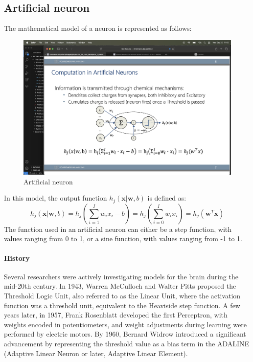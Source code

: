 \subsection{Artificial neuron}
The mathematical model of a neuron is represented as follows:
\begin{figure}[H]
    \centering
    \includegraphics[width=0.75\linewidth]{images/neuron.png}
    \caption{Artificial neuron}
\end{figure}
In this model, the output function $h_j(\mathbf{x}|\mathbf{w},b)$ is defined as:
\[h_j(\mathbf{x}|\mathbf{w},b)=h_j\left(\sum_{i=1}^Iw_ix_i-b\right)=h_j\left(\sum_{i=0}^Iw_ix_i\right)=h_j\left(\mathbf{w}^T\mathbf{x}\right)\]
The function used in an artificial neuron can either be a step function, with values ranging from 0 to 1, or a sine function, with values ranging from -1 to 1.

\paragraph*{History}
Several researchers were actively investigating models for the brain during the mid-20th century. 
In 1943, Warren McCulloch and Walter Pitts proposed the Threshold Logic Unit, also referred to as the Linear Unit, where the activation function was a threshold unit, equivalent to the Heaviside step function. 
A few years later, in 1957, Frank Rosenblatt developed the first Perceptron, with weights encoded in potentiometers, and weight adjustments during learning were performed by electric motors. 
By 1960, Bernard Widrow introduced a significant advancement by representing the threshold value as a bias term in the ADALINE (Adaptive Linear Neuron or later, Adaptive Linear Element). 

